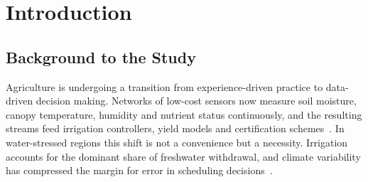 \documentclass[12pt,a4paper,oneside]{book}
\begin{document}
\clearpage
 \begin{ubonehalfspace}

\clearpage
 \end{ubonehalfspace}
\begin{ubonehalfspace}

\clearpage
 \end{ubonehalfspace}

\begin{ubonehalfspace}
\renewcommand{\contentsname}{}
\tableofcontents
\end{ubonehalfspace}
\clearpage

\begin{ubonehalfspace}
\renewcommand{\listfigurename}{}
\listoffigures
\end{ubonehalfspace}
\clearpage

\begin{ubonehalfspace}
\renewcommand{\listtablename}{}
\listoftables
\end{ubonehalfspace}
\clearpage

\begin{ubonehalfspace}
\printunsrtglossary[type=abbreviations,title={},style=long]
\end{ubonehalfspace}
\clearpage

\mainmatter

\clearpage{}

\chapter{Introduction}
\label{ch:introduction}

\section{Background to the Study}
\label{sec:background}

Agriculture is undergoing a transition from experience-driven practice to
data-driven decision making. Networks of low-cost sensors now measure soil
moisture, canopy temperature, humidity and nutrient status continuously, and
the resulting streams feed irrigation controllers, yield models and
certification schemes~\cite{rathi2025smart, brooks2019precisionWater}. In
water-stressed regions this shift is not a convenience but a necessity.
Irrigation accounts for the dominant share of freshwater withdrawal, and
climate variability has compressed the margin for error in scheduling
decisions~\cite{miller2020climateImpact, williams2022savings}.
\end{document}
